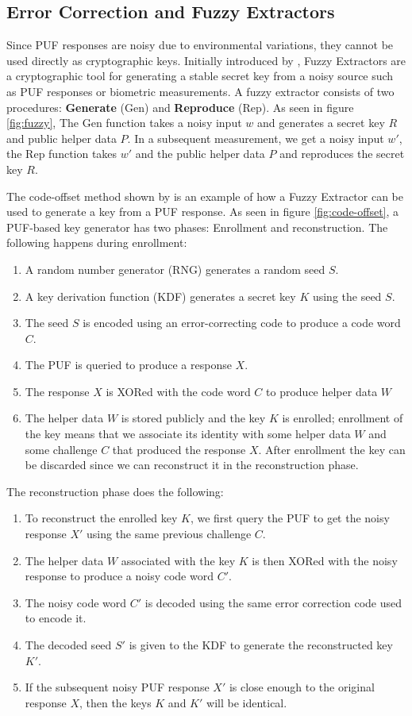 \subsection{Error Correction and Fuzzy Extractors}
Since PUF responses are noisy due to environmental variations, they cannot be used directly as cryptographic keys. Initially introduced by \cite{Dodis_2008}, Fuzzy Extractors are a cryptographic tool for generating a stable secret key from a noisy source such as PUF responses or biometric measurements. A fuzzy extractor consists of two procedures: \textbf{Generate} (Gen) and \textbf{Reproduce} (Rep). As seen in figure \ref{fig:fuzzy}, The Gen function takes a noisy input $w$ and generates a secret key $R$ and public helper data $P$. In a subsequent measurement, we get a noisy input $w'$, the Rep function takes $w'$ and the public helper data $P$ and reproduces the secret key $R$.

The code-offset method shown by \cite{Maes_2016} is an example of how a Fuzzy Extractor can be used to generate a key from a PUF response. As seen in figure \ref{fig:code-offset}, a PUF-based key generator has two phases: Enrollment and reconstruction. The following happens during enrollment:
\begin{enumerate}
    \item A random number generator (RNG) generates a random seed $S$.
    \item A key derivation function (KDF) generates a secret key $K$ using the seed $S$.
    \item The seed $S$ is encoded using an error-correcting code to produce a code word $C$.
    \item The PUF is queried to produce a response $X$.
    \item The response $X$ is XORed with the code word $C$ to produce helper data $W$
    \item The helper data $W$ is stored publicly and the key $K$ is enrolled; enrollment of the key means that we associate its identity with some helper data $W$ and some challenge $C$ that produced the response $X$. After enrollment the key can be discarded since we can reconstruct it in the reconstruction phase.
\end{enumerate}
The reconstruction phase does the following:
\begin{enumerate}
    \item To reconstruct the enrolled key $K$, we first query the PUF to get the noisy response $X'$ using the same previous challenge $C$.
    \item The helper data $W$ associated with the key $K$ is then XORed with the noisy response to produce a noisy code word $C'$.
    \item The noisy code word $C'$ is decoded using the same error correction code used to encode it.
    \item The decoded seed $S'$ is given to the KDF to generate the reconstructed key $K'$.
    \item If the subsequent noisy PUF response $X'$ is close enough to the original response $X$, then the keys $K$ and $K'$ will be identical.
\end{enumerate}

